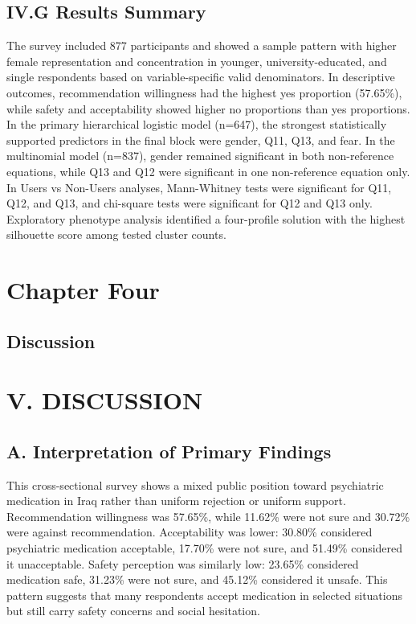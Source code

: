 \subsection{IV.G Results Summary}\label{iv.g-results-summary}

The survey included 877 participants and showed a sample pattern with
higher female representation and concentration in younger,
university-educated, and single respondents based on variable-specific
valid denominators. In descriptive outcomes, recommendation willingness
had the highest yes proportion (57.65\%), while safety and acceptability
showed higher no proportions than yes proportions. In the primary
hierarchical logistic model (n=647), the strongest statistically
supported predictors in the final block were gender, Q11, Q13, and fear.
In the multinomial model (n=837), gender remained significant in both
non-reference equations, while Q13 and Q12 were significant in one
non-reference equation only. In Users vs Non-Users analyses,
Mann-Whitney tests were significant for Q11, Q12, and Q13, and
chi-square tests were significant for Q12 and Q13 only. Exploratory
phenotype analysis identified a four-profile solution with the highest
silhouette score among tested cluster counts.

\section{Chapter Four}\label{chapter-four}

\subsection{Discussion}\label{discussion}

\section{V. DISCUSSION}\label{v.-discussion}

\subsection{A. Interpretation of Primary
Findings}\label{a.-interpretation-of-primary-findings}

This cross-sectional survey shows a mixed public position toward
psychiatric medication in Iraq rather than uniform rejection or uniform
support. Recommendation willingness was 57.65\%, while 11.62\% were not
sure and 30.72\% were against recommendation. Acceptability was lower:
30.80\% considered psychiatric medication acceptable, 17.70\% were not
sure, and 51.49\% considered it unacceptable. Safety perception was
similarly low: 23.65\% considered medication safe, 31.23\% were not
sure, and 45.12\% considered it unsafe. This pattern suggests that many
respondents accept medication in selected situations but still carry
safety concerns and social hesitation.

